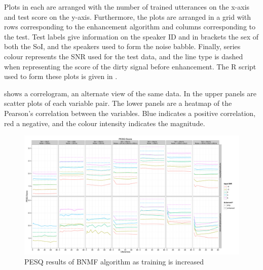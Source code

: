 Plots in 
each are arranged with the number of trained utterances on the x-axis
and test score on the y-axis. Furthermore, the plots are arranged
in a grid with rows corresponding to the enhancement algorithm and
columns corresponding to the test. Test labels give information on
the speaker ID and in brackets the sex of both the SoI, and the speakers
used to form the noise babble. Finally, series colour represents the
\ac{SNR} used for the test data, and the line type is dashed when
representing the score of the dirty signal before enhancement. The
R script used to form these plots is given in .

 shows a correlogram, an alternate view of
the same data. In the upper panels are scatter plots of each variable
pair. The lower panels are a heatmap of the Pearson's correlation
between the variables. Blue indicates a positive correlation, red
a negative, and the colour intensity indicates the magnitude.

\begin{figure}[p]
\noindent \begin{centering}
\includegraphics[angle=90,width=1\textwidth,height=0.95\textheight]{fig/R/train/pesq}
\par\end{centering}

\protect\caption{\label{fig:vary-train-pesq}\acs{PESQ} results of \acs{BNMF} algorithm
as training is increased}
\end{figure}


